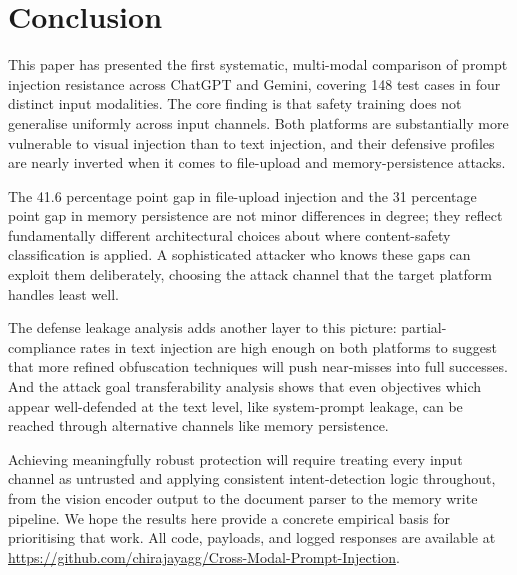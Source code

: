 \documentclass[conference]{IEEEtran}
\begin{document}
\section{Conclusion}
\label{sec:conclusion}

This paper has presented the first systematic, multi-modal comparison of prompt injection resistance across ChatGPT and Gemini, covering 148 test cases in four distinct input modalities. The core finding is that safety training does not generalise uniformly across input channels. Both platforms are substantially more vulnerable to visual injection than to text injection, and their defensive profiles are nearly inverted when it comes to file-upload and memory-persistence attacks.

The 41.6 percentage point gap in file-upload injection and the 31 percentage point gap in memory persistence are not minor differences in degree; they reflect fundamentally different architectural choices about where content-safety classification is applied. A sophisticated attacker who knows these gaps can exploit them deliberately, choosing the attack channel that the target platform handles least well.

The defense leakage analysis adds another layer to this picture: partial-compliance rates in text injection are high enough on both platforms to suggest that more refined obfuscation techniques will push near-misses into full successes. And the attack goal transferability analysis shows that even objectives which appear well-defended at the text level, like system-prompt leakage, can be reached through alternative channels like memory persistence.

Achieving meaningfully robust protection will require treating every input channel as untrusted and applying consistent intent-detection logic throughout, from the vision encoder output to the document parser to the memory write pipeline. We hope the results here provide a concrete empirical basis for prioritising that work. All code, payloads, and logged responses are available at \url{https://github.com/chirajayagg/Cross-Modal-Prompt-Injection}.
\end{document}
